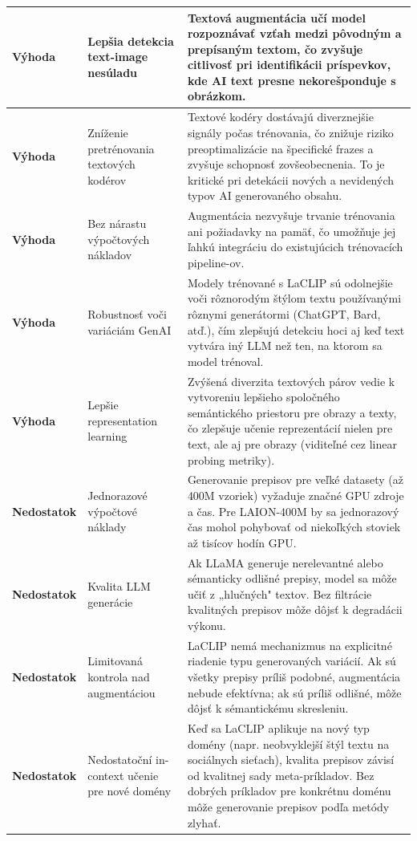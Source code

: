 \documentclass[]{tukediphc}
\begin{document}
{\begin{longtable}{|p{}|p{}|p{}|}
\textbf{Výhoda} & Lepšia detekcia text-image nesúladu & Textová augmentácia učí model rozpoznávať vzťah medzi pôvodným a prepísaným textom, čo zvyšuje citlivosť pri identifikácii príspevkov, kde AI text presne nekorešponduje s obrázkom. \\
\hline
\textbf{Výhoda} & Zníženie pretrénovania textových kodérov & Textové kodéry dostávajú diverznejšie signály počas trénovania, čo znižuje riziko preoptimalizácie na špecifické frazes a zvyšuje schopnosť zovšeobecnenia. To je kritické pri detekácii nových a nevidených typov AI generovaného obsahu. \\
\hline
\textbf{Výhoda} & Bez nárastu výpočtových nákladov & Augmentácia nezvyšuje trvanie trénovania ani požiadavky na pamäť, čo umožňuje jej ľahkú integráciu do existujúcich trénovacích pipeline-ov. \\
\hline
\textbf{Výhoda} & Robustnosť voči variáciám GenAI & Modely trénované s LaCLIP sú odolnejšie voči rôznorodým štýlom textu používanými rôznymi generátormi (ChatGPT, Bard, atď.), čím zlepšujú detekciu hoci aj keď text vytvára iný LLM než ten, na ktorom sa model trénoval\cite{LaCLIP}. \\
\hline
\textbf{Výhoda} & Lepšie representation learning & Zvýšená diverzita textových párov vedie k vytvoreniu lepšieho spoločného semántického priestoru pre obrazy a texty, čo zlepšuje učenie reprezentácií nielen pre text, ale aj pre obrazy (viditeľné cez linear probing metriky). \\
\hline
\textbf{Nedostatok} & Jednorazové výpočtové náklady & Generovanie prepisov pre veľké datasety (až 400M vzoriek) vyžaduje značné GPU zdroje a čas. Pre LAION-400M by sa jednorazový čas mohol pohybovať od niekoľkých stoviek až tisícov hodín GPU\cite{LaCLIP}. \\
\hline
\textbf{Nedostatok} & Kvalita LLM generácie & Ak LLaMA generuje nerelevantné alebo sémanticky odlišné prepisy, model sa môže učiť z „hlučných" textov. Bez filtrácie kvalitných prepisov môže dôjsť k degradácii výkonu\cite{LaCLIP}. \\
\hline
\textbf{Nedostatok} & Limitovaná kontrola nad augmentáciou & LaCLIP nemá mechanizmus na explicitné riadenie typu generovaných variácií. Ak sú všetky prepisy príliš podobné, augmentácia nebude efektívna; ak sú príliš odlišné, môže dôjsť k sémantickému skresleniu. \\
\hline
\textbf{Nedostatok} & Nedostatoční in-context učenie pre nové domény & Keď sa LaCLIP aplikuje na nový typ domény (napr. neobvyklejší štýl textu na sociálnych sieťach), kvalita prepisov závisí od kvalitnej sady meta-príkladov. Bez dobrých príkladov pre konkrétnu doménu môže generovanie prepisov podľa metódy zlyhať. \\
\hline
\end{longtable}
}
\end{document}
